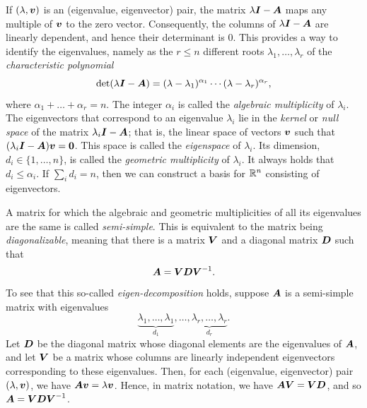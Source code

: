 If \((\lambda, \boldsymbol{v})\) is an (eigenvalue, eigenvector) pair, the matrix \(\lambda \boldsymbol{I} - \boldsymbol{A}\) maps any multiple of \(\boldsymbol{v}\) to the zero vector. Consequently, the columns of \(\lambda \boldsymbol{I} - \boldsymbol{A}\) are linearly dependent, and hence their determinant is 0. This provides a way to identify the eigenvalues, namely as the \(r \le n\) different roots \(\lambda_1, \dots, \lambda_r\) of the \textit{characteristic polynomial}
\begin{equation*}
	\det(\lambda \boldsymbol{I} - \boldsymbol{A}) = (\lambda - \lambda_1)^{\alpha_1} \cdots (\lambda - \lambda_r)^{\alpha_r},
\end{equation*}
where \(\alpha_1 + \dots + \alpha_r = n\). The integer \(\alpha_i\) is called the \textit{algebraic multiplicity} of \(\lambda_i\). The eigenvectors that correspond to an eigenvalue \(\lambda_i\) lie in the \textit{kernel} or \textit{null space} of the matrix \(\lambda_i \boldsymbol{I} - \boldsymbol{A}\); that is, the linear space of vectors \(\boldsymbol{v}\) such that \((\lambda_i \boldsymbol{I} - \boldsymbol{A})\boldsymbol{v} = \boldsymbol{0}\). This space is called the \textit{eigenspace} of \(\lambda_i\). Its dimension, \(d_i \in \{1, \dots, n\}\), is called the \textit{geometric multiplicity} of \(\lambda_i\). It always holds that \(d_i \le \alpha_i\). If \(\sum_i d_i = n\), then we can construct a basis for \(\mathbb{R}^n\) consisting of eigenvectors.

A matrix for which the algebraic and geometric multiplicities of all its eigenvalues are the same is called \textit{semi-simple}. This is equivalent to the matrix being \textit{diagonalizable}, meaning that there is a matrix \(\boldsymbol{V}\) and a diagonal matrix \(\boldsymbol{D}\) such that
\begin{equation*}
	\boldsymbol{A} = \boldsymbol{V} \boldsymbol{D} \boldsymbol{V}^{-1}.
\end{equation*}
To see that this so-called \textit{eigen-decomposition} holds, suppose \(\boldsymbol{A}\) is a semi-simple matrix with eigenvalues
\begin{equation*}
	\underbrace{\lambda_1, \dots, \lambda_1}_{d_1}, \dots, \underbrace{\lambda_r, \dots, \lambda_r}_{d_r}.
\end{equation*}
Let \(\boldsymbol{D}\) be the diagonal matrix whose diagonal elements are the eigenvalues of \(\boldsymbol{A}\), and let \(\boldsymbol{V}\) be a matrix whose columns are linearly independent eigenvectors corresponding to these eigenvalues. Then, for each (eigenvalue, eigenvector) pair \((\lambda, \boldsymbol{v})\), we have \(\boldsymbol{A}\boldsymbol{v} = \lambda \boldsymbol{v}\). Hence, in matrix notation, we have \(\boldsymbol{A}\boldsymbol{V} = \boldsymbol{V}\boldsymbol{D}\), and so \(\boldsymbol{A} = \boldsymbol{V}\boldsymbol{D}\boldsymbol{V}^{-1}\).

